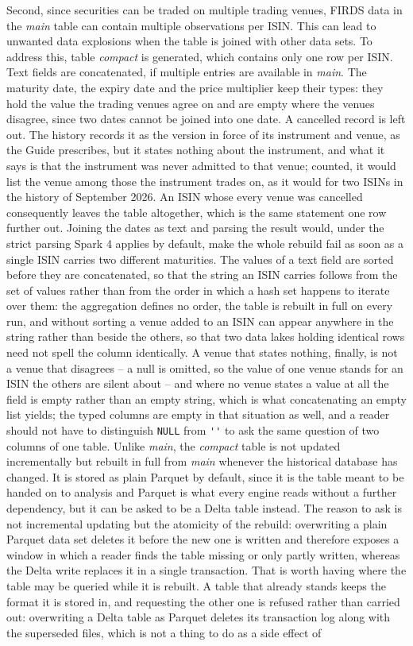Second, since securities can be traded on multiple trading venues, FIRDS data in the \emph{main} table can contain multiple observations per ISIN. This can lead to unwanted data explosions when the table is joined with other data sets. To address this, table \emph{compact} is generated, which contains only one row per ISIN. Text fields are concatenated, if multiple entries are available in \emph{main}. The maturity date, the expiry date and the price multiplier keep their types: they hold the value the trading venues agree on and are empty where the venues disagree, since two dates cannot be joined into one date. A cancelled record is left out. The history records it as the version in force of its instrument and venue, as the Guide prescribes, but it states nothing about the instrument, and what it says is that the instrument was never admitted to that venue; counted, it would list the venue among those the instrument trades on, as it would for two ISINs in the history of September 2026. An ISIN whose every venue was cancelled consequently leaves the table altogether, which is the same statement one row further out. Joining the dates as text and parsing the result would, under the strict parsing Spark 4 applies by default, make the whole rebuild fail as soon as a single ISIN carries two different maturities. The values of a text field are sorted before they are concatenated, so that the string an ISIN carries follows from the set of values rather than from the order in which a hash set happens to iterate over them: the aggregation defines no order, the table is rebuilt in full on every run, and without sorting a venue added to an ISIN can appear anywhere in the string rather than beside the others, so that two data lakes holding identical rows need not spell the column identically. A venue that states nothing, finally, is not a venue that disagrees -- a null is omitted, so the value of one venue stands for an ISIN the others are silent about -- and where no venue states a value at all the field is empty rather than an empty string, which is what concatenating an empty list yields; the typed columns are empty in that situation as well, and a reader should not have to distinguish \verb|NULL| from \verb|''| to ask the same question of two columns of one table. Unlike \emph{main}, the \emph{compact} table is not updated incrementally but rebuilt in full from \emph{main} whenever the historical database has changed. It is stored as plain Parquet by default, since it is the table meant to be handed on to analysis and Parquet is what every engine reads without a further dependency, but it can be asked to be a Delta table instead. The reason to ask is not incremental updating but the atomicity of the rebuild: overwriting a plain Parquet data set deletes it before the new one is written and therefore exposes a window in which a reader finds the table missing or only partly written, whereas the Delta write replaces it in a single transaction. That is worth having where the table may be queried while it is rebuilt. A table that already stands keeps the format it is stored in, and requesting the other one is refused rather than carried out: overwriting a Delta table as Parquet deletes its transaction log along with the superseded files, which is not a thing to do as a side effect of 